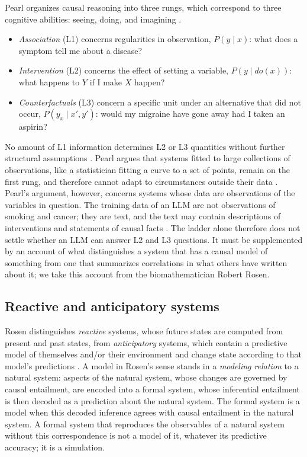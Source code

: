 \documentclass{llncs}
\begin{document}
Pearl organizes causal reasoning into three rungs, which correspond to three cognitive abilities: seeing, doing, and imagining \cite{pearl2009causality,pearl2018bookOfWhy}.
\begin{itemize}
    \item \emph{Association} (L1) concerns regularities in observation, $P(y \mid x)$: what does a symptom tell me about a disease?
    \item \emph{Intervention} (L2) concerns the effect of setting a variable, $P(y \mid do(x))$: what happens to $Y$ if I make $X$ happen?
    \item \emph{Counterfactuals} (L3) concern a specific unit under an alternative that did not occur, $P(y_x \mid x', y')$: would my migraine have gone away had I taken an aspirin?
\end{itemize}
No amount of L1 information determines L2 or L3 quantities without further structural assumptions \cite{pearl2018theoretical}. Pearl argues that systems fitted to large collections of observations, like a statistician fitting a curve to a set of points, remain on the first rung, and therefore cannot adapt to circumstances outside their data \cite{pearl2018theoretical,pearl2018bookOfWhy}. Pearl's argument, however, concerns systems whose data are observations of the variables in question. The training data of an LLM are not observations of smoking and cancer; they are text, and the text may contain descriptions of interventions and statements of causal facts \cite{Zecevic2023CausalPL}. The ladder alone therefore does not settle whether an LLM can answer L2 and L3 questions. It must be supplemented by an account of what distinguishes a system that has a causal model of something from one that summarizes correlations in what others have written about it; we take this account from the biomathematician Robert Rosen.

\subsection{Reactive and anticipatory systems}
\label{sec:rosen}

Rosen distinguishes \emph{reactive} systems, whose future states are computed from present and past states, from \emph{anticipatory} systems, which contain a predictive model of themselves and/or their environment and change state according to that model's predictions \cite{rosen2012anticipatory}. A model in Rosen's sense stands in a \emph{modeling relation} to a natural system: aspects of the natural system, whose changes are governed by causal entailment, are encoded into a formal system, whose inferential entailment is then decoded as a prediction about the natural system. The formal system is a model when this decoded inference agrees with causal entailment in the natural system. A formal system that reproduces the observables of a natural system without this correspondence is not a model of it, whatever its predictive accuracy; it is a simulation.
\end{document}

